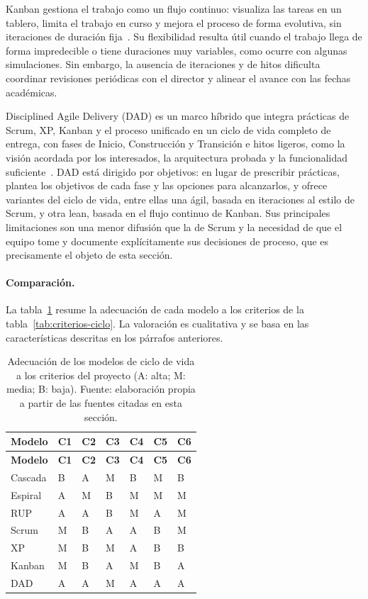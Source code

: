 Kanban gestiona el trabajo como un flujo continuo: visualiza las tareas en un tablero, limita el trabajo en curso y mejora el proceso de forma evolutiva, sin iteraciones de duración fija~\cite{anderson2010kanban}. Su flexibilidad resulta útil cuando el trabajo llega de forma impredecible o tiene duraciones muy variables, como ocurre con algunas simulaciones. Sin embargo, la ausencia de iteraciones y de hitos dificulta coordinar revisiones periódicas con el director y alinear el avance con las fechas académicas.

Disciplined Agile Delivery (DAD) es un marco híbrido que integra prácticas de Scrum, XP, Kanban y el proceso unificado en un ciclo de vida completo de entrega, con fases de Inicio, Construcción y Transición e hitos ligeros, como la visión acordada por los interesados, la arquitectura probada y la funcionalidad suficiente~\cite{ambler2012dad}. DAD está dirigido por objetivos: en lugar de prescribir prácticas, plantea los objetivos de cada fase y las opciones para alcanzarlos, y ofrece variantes del ciclo de vida, entre ellas una ágil, basada en iteraciones al estilo de Scrum, y otra lean, basada en el flujo continuo de Kanban. Sus principales limitaciones son una menor difusión que la de Scrum y la necesidad de que el equipo tome y documente explícitamente sus decisiones de proceso, que es precisamente el objeto de esta sección.

\paragraph{Comparación.}
La tabla~\ref{tab:comparacion-ciclos} resume la adecuación de cada modelo a los criterios de la tabla~\ref{tab:criterios-ciclo}. La valoración es cualitativa y se basa en las características descritas en los párrafos anteriores.

\begin{longtable}{|p{}|p{}|p{}|p{}|p{}|p{}|p{}|}
\caption{Adecuación de los modelos de ciclo de vida a los criterios del proyecto (A: alta; M: media; B: baja). Fuente: elaboración propia a partir de las fuentes citadas en esta sección.}\label{tab:comparacion-ciclos}\\
\hline
\textbf{Modelo} & \textbf{C1} & \textbf{C2} & \textbf{C3} & \textbf{C4} & \textbf{C5} & \textbf{C6}\\\hline
\endfirsthead
\hline
\textbf{Modelo} & \textbf{C1} & \textbf{C2} & \textbf{C3} & \textbf{C4} & \textbf{C5} & \textbf{C6}\\\hline
\endhead
Cascada & B & A & M & B & M & B\\\hline
Espiral & A & M & B & M & M & M\\\hline
RUP & A & A & B & M & A & M\\\hline
Scrum & M & B & A & A & B & M\\\hline
XP & M & B & M & A & B & B\\\hline
Kanban & M & B & A & M & B & A\\\hline
DAD & A & A & M & A & A & A\\\hline
\end{longtable}

